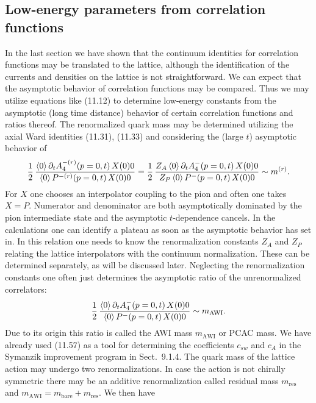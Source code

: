 \subsection{Low-energy parameters from correlation functions}
\label{sec:lowenergy}
In the last section we have shown that the continuum identities for correlation
functions may be translated to the lattice, although the identification of the
currents and densities on the lattice is not straightforward. We can expect
that the asymptotic behavior of correlation functions may be compared. Thus
we may utilize equations like (11.12) to determine low-energy constants from
the asymptotic (long time distance) behavior of certain correlation functions
and ratios thereof.
The renormalized quark mass may be determined utilizing the axial Ward
identities (11.31), (11.33) and considering the (large $t$) asymptotic behavior of
\begin{equation}
\frac{1}{2}\,
\frac{\left\langle 0 \right\rangle{\partial_t A_4^{-(r)}(p = 0, t)\,X(0)}{0}}
{\left\langle 0 \right\rangle{P^{-(r)}(p = 0, t)\,X(0)}{0}}
= \frac{1}{2}\,
\frac{Z_A \left\langle 0 \right\rangle{\partial_t A_4^-(p = 0, t)\,X(0)}{0}}
{Z_P \left\langle 0 \right\rangle{P^-(p = 0, t)\,X(0)}{0}}
\sim m^{(r)} .
\end{equation}
For $X$ one chooses an interpolator coupling to the pion and often one takes
$X = P$. Numerator and denominator are both asymptotically dominated by
the pion intermediate state and the asymptotic $t$-dependence cancels. In the
calculations one can identify a plateau as soon as the asymptotic behavior has
set in. In this relation one needs to know the renormalization constants $Z_A$
and $Z_P$ relating the lattice interpolators with the continuum normalization.
These can be determined separately, as will be discussed later.
Neglecting the renormalization constants one often just determines the
asymptotic ratio of the unrenormalized correlators:
\begin{equation}
\frac{1}{2}\,
\frac{\left\langle 0 \right\rangle{\partial_t A_4^-(p = 0, t)\,X(0)}{0}}
{\left\langle 0 \right\rangle{P^-(p = 0, t)\,X(0)}{0}}
\sim m_{\mathrm{AWI}} .
\end{equation}
Due to its origin this ratio is called the AWI mass $m_{\mathrm{AWI}}$ or PCAC mass. We
have already used (11.57) as a tool for determining the coefficients $c_{sw}$ and $c_A$
in the Symanzik improvement program in Sect.~9.1.4.
The quark mass of the lattice action may undergo two renormalizations.
In case the action is not chirally symmetric there may be an additive renormalization called residual mass $m_{\mathrm{res}}$ and $m_{\mathrm{AWI}} = m_{\mathrm{bare}} + m_{\mathrm{res}}$. We then have
